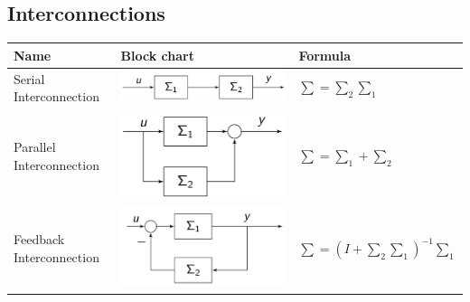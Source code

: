 \subsection{Interconnections}
        \begin{tabu}{X[m] X[3, c, m] X[2, m]}
            \textbf{Name}               & \textbf{Block chart}                                                                      & \textbf{Formula}\\
            \hline \hline
            Serial Interconnection      & \includegraphics[width = \linewidth]{src/images/interconnection_serial.png}               & $\sum = \sum_2 \sum_1$\\
            \hline
            Parallel Interconnection    & \includegraphics[width = \linewidth]{src/images/interconnection_parallel.png}             & $\sum = \sum_1 + \sum_2$\\
            \hline
            Feedback Interconnection    & \includegraphics[width = \linewidth]{src/images/interconnection_negative_feedback.png}    & $\sum = (I + \sum_2 \sum_1)^{-1} \sum_1$
        \end{tabu}